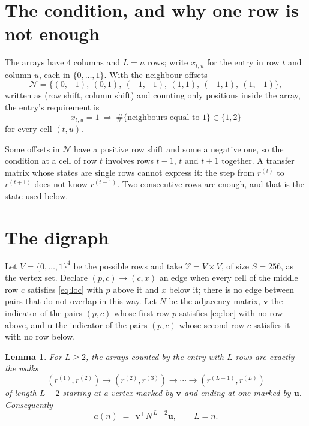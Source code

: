 \documentclass[11pt,a4paper]{article}
\theoremstyle{plain}
\newtheorem{lemma}[theorem]{Lemma}
\theoremstyle{definition}
\begin{document}
\section{The condition, and why one row is not enough}

The arrays have $4$ columns and $L=n$ rows; write $x_{t,u}$ for the entry in
row $t$ and column $u$, each in $\{0,\dots,1\}$. With the neighbour offsets
\[
\mathcal N=\{(0,-1),\ (0,1),\ (-1,-1),\ (1,1),\ (-1,1),\ (1,-1)\},
\]
written as (row shift, column shift) and counting only positions inside the array, the
entry's requirement is
\begin{equation}\label{eq:loc}
x_{t,u}=1\ \Rightarrow\ \#\{\text{neighbours equal to }1\}\in\{1,2\}
\end{equation}
for every cell $(t,u)$.

Some offsets in $\mathcal N$ have a positive row shift and some a negative one, so the
condition at a cell of row $t$ involves rows $t-1$, $t$ and $t+1$ together. A transfer
matrix whose states are single rows cannot express it: the step from $r^{(t)}$ to
$r^{(t+1)}$ does not know $r^{(t-1)}$. Two consecutive rows are enough, and that is
the state used below.

\section{The digraph}

Let $V=\{0,\dots,1\}^{4}$ be the possible rows and take
$\mathcal V=V\times V$, of size $S=256$, as the vertex set. Declare $(p,c)\to(c,x)$ an edge
when every cell of the middle row $c$ satisfies \eqref{eq:loc} with $p$ above it and $x$
below it; there is no edge between pairs that do not overlap in this way. Let $N$ be the
adjacency matrix, $\mathbf{v}$ the indicator of the pairs $(p,c)$ whose first row $p$
satisfies \eqref{eq:loc} with no row above, and $\mathbf{u}$ the indicator of
the pairs $(p,c)$ whose second row $c$ satisfies it with no row below.

\begin{lemma}\label{lem:walk}
For $L\ge2$, the arrays counted by the entry with $L$ rows are exactly the walks
\[
(r^{(1)},r^{(2)})\to(r^{(2)},r^{(3)})\to\cdots\to(r^{(L-1)},r^{(L)})
\]
of length $L-2$ starting at a vertex marked by $\mathbf{v}$ and ending at one marked by
$\mathbf{u}$. Consequently
\[
a(n)\;=\;\,\mathbf{v}^{\!\top}N^{\,L-2}\mathbf{u},\qquad L=n .
\]
\end{lemma}
\end{document}
